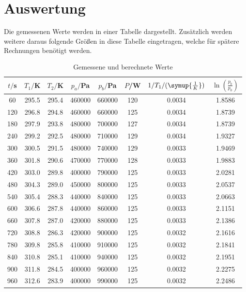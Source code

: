 \section{Auswertung}
\label{sec:Auswertung}

Die gemessenen Werte werden in einer Tabelle dargestellt. Zusätzlich werden weitere
daraus folgende Größen in diese Tabelle eingetragen, welche für spätere Rechnungen
benötigt werden.
\begin{table}[H]
  \centering
  \caption{Gemessene und berechnete Werte}
  \label{tab:Werte}
  \begin{tabular}{c c c c c c c c}
    \toprule
    $t/$s & $T_1/$K & $T_2/$K & $p_a/$Pa & $p_b/$Pa & $P$/W & $1/T_1/(\symup{\frac{1}{K}})$ & $\ln(\frac{p_b}{p_0})$ \\
    \midrule
      60  &  295.5 &  295.4 & 460000  &  660000 & 120 & 0.0034 & 1.8586 \\
     120  &  296.8 &  294.8 & 460000  &  660000 & 125 & 0.0034 & 1.8739 \\
     180  &  297.9 &  293.8 & 480000  &  700000 & 127 & 0.0034 & 1.8739 \\
     240  &  299.2 &  292.5 & 480000  &  710000 & 129 & 0.0034 & 1.9327 \\
     300  &  300.5 &  291.5 & 480000  &  740000 & 129 & 0.0033 & 1.9469 \\
     360  &  301.8 &  290.6 & 470000  &  770000 & 128 & 0.0033 & 1.9883 \\
     420  &  303.0 &  289.8 & 400000  &  790000 & 125 & 0.0033 & 2.0281 \\
     480  &  304.3 &  289.0 & 450000  &  800000 & 125 & 0.0033 & 2.0537 \\
     540  &  305.4 &  288.3 & 440000  &  840000 & 125 & 0.0033 & 2.0663 \\
     600  &  306.6 &  287.8 & 440000  &  860000 & 125 & 0.0033 & 2.1151 \\
     660  &  307.8 &  287.0 & 420000  &  880000 & 125 & 0.0033 & 2.1386 \\
     720  &  308.8 &  286.3 & 420000  &  900000 & 125 & 0.0032 & 2.1616 \\
     780  &  309.8 &  285.8 & 410000  &  910000 & 125 & 0.0032 & 2.1841 \\
     840  &  310.8 &  285.1 & 410000  &  940000 & 125 & 0.0032 & 2.1951 \\
     900  &  311.8 &  284.5 & 400000  &  960000 & 125 & 0.0032 & 2.2275 \\
     960  &  312.6 &  283.9 & 400000  &  990000 & 125 & 0.0032 & 2.2486 \\

\end{tabular}
\end{table}
